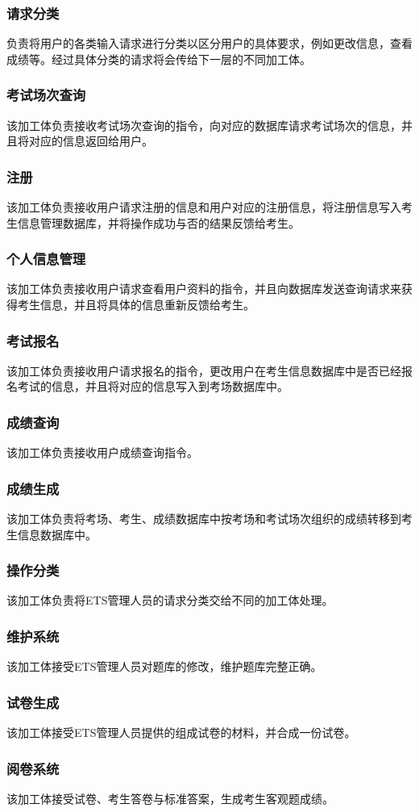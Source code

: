 \subsubsection{请求分类}
负责将用户的各类输入请求进行分类以区分用户的具体要求，例如更改信息，查看成绩等。经过具体分类的请求将会传给下一层的不同加工体。

\subsubsection{考试场次查询}
该加工体负责接收考试场次查询的指令，向对应的数据库请求考试场次的信息，并且将对应的信息返回给用户。

\subsubsection{注册}
该加工体负责接收用户请求注册的信息和用户对应的注册信息，将注册信息写入考生信息管理数据库，并将操作成功与否的结果反馈给考生。

\subsubsection{个人信息管理}
该加工体负责接收用户请求查看用户资料的指令，并且向数据库发送查询请求来获得考生信息，并且将具体的信息重新反馈给考生。

\subsubsection{考试报名}
该加工体负责接收用户请求报名的指令，更改用户在考生信息数据库中是否已经报名考试的信息，并且将对应的信息写入到考场数据库中。

\subsubsection{成绩查询}
该加工体负责接收用户成绩查询指令。

\subsubsection{成绩生成}
该加工体负责将考场、考生、成绩数据库中按考场和考试场次组织的成绩转移到考生信息数据库中。
\subsubsection{操作分类}
该加工体负责将ETS管理人员的请求分类交给不同的加工体处理。
\subsubsection{维护系统}
该加工体接受ETS管理人员对题库的修改，维护题库完整正确。
\subsubsection{试卷生成}
该加工体接受ETS管理人员提供的组成试卷的材料，并合成一份试卷。
\subsubsection{阅卷系统}
该加工体接受试卷、考生答卷与标准答案，生成考生客观题成绩。
